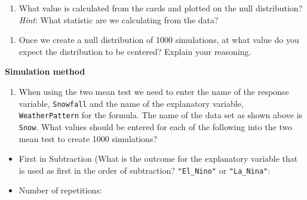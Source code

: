 \documentclass[
]{report}
\providecommand{\tightlist}{%
  \setlength{\itemsep}{0pt}\setlength{\parskip}{0pt}}
\begin{document}
\vspace{1in}

\begin{enumerate}
\def\labelenumi{\arabic{enumi}.}
\setcounter{enumi}{12}
\tightlist
\item
  What value is calculated from the cards and plotted on the null distribution? \emph{Hint}: What statistic are we calculating from the data?
\end{enumerate}

\vspace{0.3in}

\begin{enumerate}
\def\labelenumi{\arabic{enumi}.}
\setcounter{enumi}{13}
\tightlist
\item
  Once we create a null distribution of 1000 simulations, at what value do you expect the distribution to be centered? Explain your reasoning.
\end{enumerate}

\vspace{.8in}

\textbf{Simulation method}

\begin{enumerate}
\def\labelenumi{\arabic{enumi}.}
\setcounter{enumi}{14}
\tightlist
\item
  When using the two mean test we need to enter the name of the response variable, \texttt{Snowfall} and the name of the explanatory variable, \texttt{WeatherPattern} for the formula. The name of the data set as shown above is \texttt{Snow}. What values should be entered for each of the following into the two mean test to create 1000 simulations?
\end{enumerate}

\vspace{.2in}

\begin{itemize}
\tightlist
\item
  First in Subtraction (What is the outcome for the explanatory variable that is used as first in the order of subtraction? \texttt{"El\_Nino"} or \texttt{"La\_Nina"}:
\end{itemize}

\vspace{.2in}

\begin{itemize}
\tightlist
\item
  Number of repetitions:
\end{itemize}

\vspace{.2in}
\end{document}
